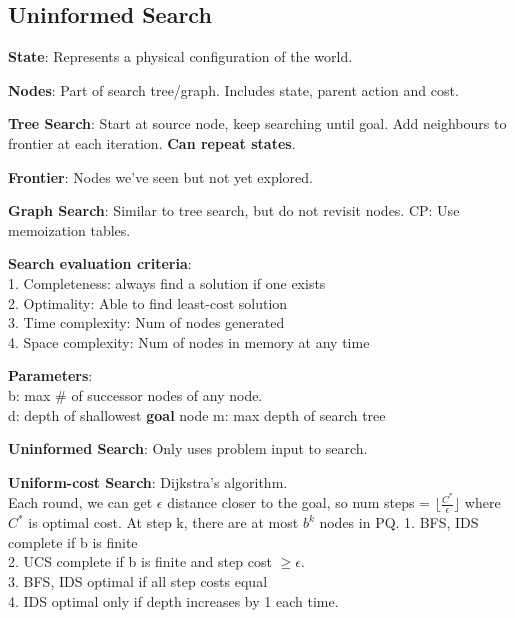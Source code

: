 \documentclass[a4paper,landscape]{article}
\newcommand{\rntopic}[1]{\vspace{-2.0em}\subsection*{#1}\vspace{-1.0em}}
\newcommand{\rnname}[1]{\textbf{#1}}
\begin{document}
\begin{multicols*}{4}
\rntopic{Uninformed Search}
\begin{flatitemize}
\vspace{0.3cm}
\item \rnname{State}: Represents a physical configuration of the world.
\item \rnname{Nodes}: Part of search tree/graph. Includes state, parent action and cost.
\item \rnname{Tree Search}: Start at source node, keep searching until goal. Add neighbours to frontier at each iteration. \textbf{Can repeat states}.
\item \rnname{Frontier}: Nodes we've seen but not yet explored.
\item \rnname{Graph Search}: Similar to tree search, but do not revisit nodes. CP: Use memoization tables.
\item \rnname{Search evaluation criteria}:\\
1. Completeness: always find a solution if one exists\\
2. Optimality: Able to find least-cost solution\\
3. Time complexity: Num of nodes generated\\
4. Space complexity: Num of nodes in memory at any time
\item \rnname{Parameters}: \\
b: max \# of successor nodes of any node.\\
d: depth of shallowest \textbf{goal} node
m: max depth of search tree
\item \rnname{Uninformed Search}: Only uses problem input to search.
\item \rnname{Uniform-cost Search}: Dijkstra's algorithm.\\
Each round, we can get $\epsilon$ distance closer to the goal, so num steps = $\lfloor \frac{C^*}{\epsilon} \rfloor$ where $C^*$ is optimal cost. At step k, there are at most $b^k$ nodes in PQ.
1. BFS, IDS complete if b is finite \\
2. UCS complete if b is finite and step cost $\geq \epsilon$. \\
3. BFS, IDS optimal if all step costs equal \\
4. IDS optimal only if depth increases by 1 each time.
\end{flatitemize}


\end{multicols*}
\end{document}
